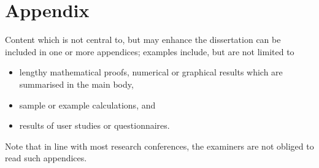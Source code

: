 \documentclass[ %
                    author={Louis Wang},
                supervisor={Dr. Qiang Liu},
                    degree={MSc},
                     title={Identification of Suicide Ideation in Texts},
                      type={},
                      year={2024}]{dissertation}
\begin{document}
%
%

\backmatter





\appendix

\chapter{Appendix}
\label{appx:example}

Content which is not central to, but may enhance the dissertation can be 
included in one or more appendices; examples include, but are not limited
to

\begin{itemize}
\item lengthy mathematical proofs, numerical or graphical results which 
      are summarised in the main body,
\item sample or example calculations, 
      and
\item results of user studies or questionnaires.
\end{itemize}

\noindent
Note that in line with most research conferences, the examiners are not
obliged to read such appendices.

\end{document}
